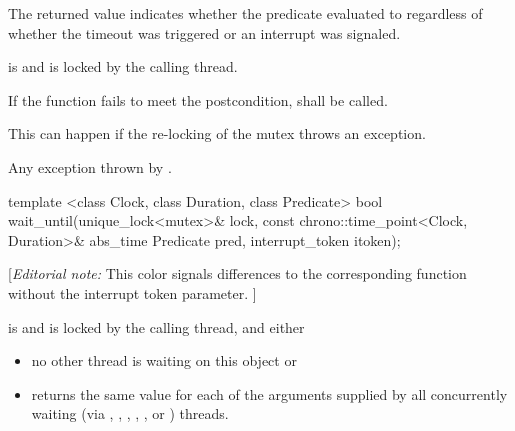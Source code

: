 {\begin{itemdescr}
 \pnum \begin{note} The returned value indicates whether the predicate evaluated to
         regardless of whether the timeout was triggered
        {\color{diffcolor} or an interrupt was signaled}. \end{note}

 \pnum \postconditions {} is  and 
        is locked by the calling thread.

 \pnum \remarks
        If the function fails to meet the postcondition, 
        shall be called.
        \begin{note} This can happen if the re-locking of the mutex throws an exception. \end{note}

 \pnum \throws Any exception thrown by .

\end{itemdescr}



\begin{itemdecl}
template <class Clock, class Duration, class Predicate>
  bool wait_until(unique_lock<mutex>& lock,
                  const chrono::time_point<Clock, Duration>& abs_time
                  Predicate pred,
                  interrupt_token itoken);
\end{itemdecl}
{\color{blue}
[{\itshape{}Editorial note:} {\color{diffcolor}This color signals differences to the corresponding  function without the interrupt token parameter.} ]
}
\begin{itemdescr}
 \pnum \requires {} is  and  is
        locked by the calling thread, and either
        \begin{itemize}
         \item no other thread is waiting on this  object or
         \item {} returns the same value for each of the 
                arguments supplied by all concurrently waiting (via ,
                , ,
                {\color{insertcolor} , , or }) threads.
        \end{itemize}


\end{itemdescr}}
